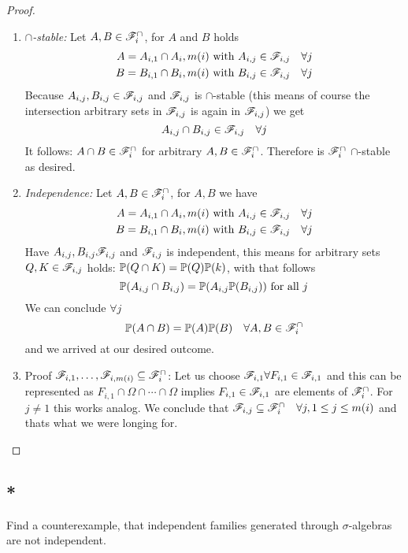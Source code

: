 \begin{proof}
	\begin{enumerate}
		\item \emph{$\cap$-stable:} Let $A,B \in \mathscr{F}_i^{\cap}$, for $A$ and $B$ holds
			\begin{align*}
				A = A_{i,1} \cap A_i, m(i) \text{ with } A_{i,j} \in \mathscr{F}_{i,j} \quad \forall j \\
				B = B_{i,1} \cap B_i, m(i) \text{ with } B_{i,j} \in \mathscr{F}_{i,j} \quad \forall j
			\end{align*}
		Because $A_{i,j}, B_{i,j} \in \mathscr{F}_{i,j}$ and $\mathscr{F}_{i,j}$ is $\cap$-stable (this means of course the intersection arbitrary sets in $\mathscr{F}_{i,j}$ is again in $\mathscr{F}_{i,j}$) we get
		\[
			A_{i,j} \cap B_{i,j} \in \mathscr{F}_{i,j} \quad \forall j
		\]
		It follows: $A\cap B \in \mathscr{F}_i^{\cap}$ for arbitrary $A,B \in \mathscr{F}_i^{\cap}$. Therefore is $\mathscr{F}_i^{\cap}$ $\cap$-stable as desired.
		\item \emph{Independence:} Let $A,B \in \mathscr{F}_i^{\cap}$, for $A,B$ we have
		\begin{align*}
			A = A_{i,1} \cap A_i, m(i) \text{ with } A_{i,j} \in \mathscr{F}_{i,j} \quad \forall j \\
			B = B_{i,1} \cap B_i, m(i) \text{ with } B_{i,j} \in \mathscr{F}_{i,j} \quad \forall j
		\end{align*}
		Have $A_{i,j}, B_{i,j} \mathscr{F}_{i,j}$ and $\mathscr{F}_{i,j}$ is independent, this means for arbitrary sets $Q, K \in \mathscr{F}_{i,j}$ holds: $\mathbb{P}(Q\cap K) = \mathbb{P}(Q)\mathbb{P}(k)$, with that follows
		\[
			\mathbb{P}(A_{i,j} \cap B_{i,j}) = \mathbb{P}(A_{i,j}\mathbb{P}(B_{i,j})) \text{ for all }j
		\]
		We can conclude $\forall j$
		\[
			\mathbb{P}(A\cap B) = \mathbb{P}(A)\mathbb{P}(B) \quad \forall A,B \in \mathscr{F}_i^{\cap}
		\]
		and we arrived at our desired outcome.
		\item Proof $\mathscr{F}_{i,1}, \dots, \mathscr{F}_{i,m(i)} \subseteq \mathscr{F}_i^{\cap}$:
		Let us choose $\mathscr{F}_{i,1} \forall F_{i,1} \in \mathscr{F}_{i,1}$ and this can be represented as $F_{i,1} \cap \Omega \cap \cdots \cap \Omega$ implies $F_{i,1} \in \mathscr{F}_{i,1}$ are elements of $\mathscr{F}_i^{\cap}$. For $j \neq 1$ this works analog. We conclude that $\mathscr{F}_{i,j} \subseteq \mathscr{F}_i^{\cap} \quad \forall j , 1\le j \le m(i)$ and thats what we were longing for.
	\end{enumerate}
\end{proof}
\subsection{*}
Find a counterexample, that independent families generated through $\sigma$-algebras are not independent.

